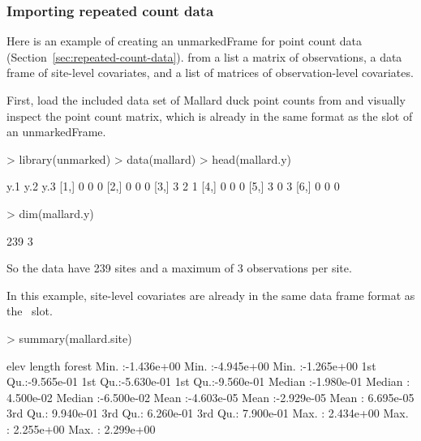 \documentclass[article,shortnames]{jss}
\newcommand{\scovs}{\code{siteCovs}}
\begin{document}
\subsubsection{Importing repeated count data}

Here is an example of creating an unmarkedFrame for point count data
(Section~\ref{sec:repeated-count-data}).
from a list a matrix of observations, a data frame of site-level
covariates, and a list of matrices of observation-level covariates.

First, load the included data set of Mallard duck point counts from
\citet{Kery2005} and visually inspect the point count matrix, which is
already in the same format as the  slot of an unmarkedFrame.

\begin{Schunk}
\begin{Sinput}
> library(unmarked)
> data(mallard)
> head(mallard.y)
\end{Sinput}
\begin{Soutput}
     y.1 y.2 y.3
[1,]   0   0   0
[2,]   0   0   0
[3,]   3   2   1
[4,]   0   0   0
[5,]   3   0   3
[6,]   0   0   0
\end{Soutput}
\begin{Sinput}
> dim(mallard.y)
\end{Sinput}
\begin{Soutput}
[1] 239   3
\end{Soutput}
\end{Schunk}

So the data have 239 sites and a maximum of
3 observations per site. 
  
In this example, site-level covariates are already in the same data
frame format as the \scovs\ slot.  

\begin{Schunk}
\begin{Sinput}
> summary(mallard.site)
\end{Sinput}
\begin{Soutput}
      elev                length               forest          
 Min.   :-1.436e+00   Min.   :-4.945e+00   Min.   :-1.265e+00  
 1st Qu.:-9.565e-01   1st Qu.:-5.630e-01   1st Qu.:-9.560e-01  
 Median :-1.980e-01   Median : 4.500e-02   Median :-6.500e-02  
 Mean   :-4.603e-05   Mean   :-2.929e-05   Mean   : 6.695e-05  
 3rd Qu.: 9.940e-01   3rd Qu.: 6.260e-01   3rd Qu.: 7.900e-01  
 Max.   : 2.434e+00   Max.   : 2.255e+00   Max.   : 2.299e+00  
\end{Soutput}
\end{Schunk}
\end{document}

